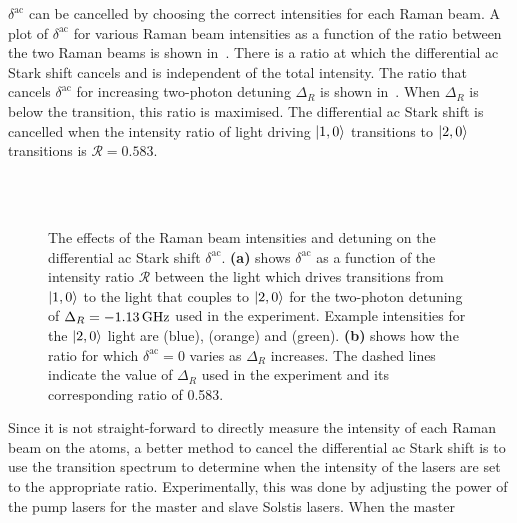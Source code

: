\(\delta^\text{ac}\) can be cancelled by choosing the correct
intensities for each Raman beam. A plot of \(\delta^{\text{ac}}\)
for various Raman beam intensities as a function of the ratio between
the two Raman beams is shown in~. There
is a ratio at which the differential ac Stark shift cancels and is
independent of the total intensity. The ratio that cancels
\(\delta^\text{ac}\) for increasing two-photon detuning \(\Delta_R\) is shown
in~. When \(\Delta_R\) is
 below the  transition, this
ratio is maximised. The differential ac Stark shift is cancelled when
the intensity ratio of light driving \(\ket{1,0}\) transitions to
\(\ket{2,0}\) transitions is \(\mathcal{R} = 0.583\). 
\begin{figure}[htbp!]
	\centering
	\def\svgwidth{\columnwidth}
	\\
\\
	\caption[Differential ac Stark shift as a function of two-photon
  detuning and Raman beam intensities.]{The effects of the Raman beam
  intensities and detuning on the differential ac Stark shift
  \(\delta^\text{ac}\).
\textbf{(a)} shows \(\delta^\text{ac}\) as a function of the intensity ratio
\(\mathcal{R}\) between the light which drives transitions from
\(\ket{1,0}\) to the light that couples to \(\ket{2,0}\) for the
two-photon detuning of \(\Delta_R = -\sivalue{1.13}{\giga\hertz}\)
used in the experiment. Example
intensities for the \(\ket{2,0}\) light are
 (blue),
 (orange) and
 (green). \textbf{(b)} shows how
the ratio for which \(\delta^\text{ac} = 0\) varies as \(\Delta_R\)
increases. The dashed lines indicate the value of \(\Delta_R\) used in
the experiment and its corresponding ratio of 0.583.}
	\label{fig:light_shift_plots}
\end{figure}
\par\noindent
Since it is not straight-forward to directly measure the intensity of
each Raman beam on the atoms, a better method to cancel the
differential ac Stark shift is to use the transition spectrum to
determine when the intensity of the lasers are set to the appropriate
ratio. Experimentally, this was done by adjusting the power of the
pump lasers for the master and slave Solstis lasers. When the master
